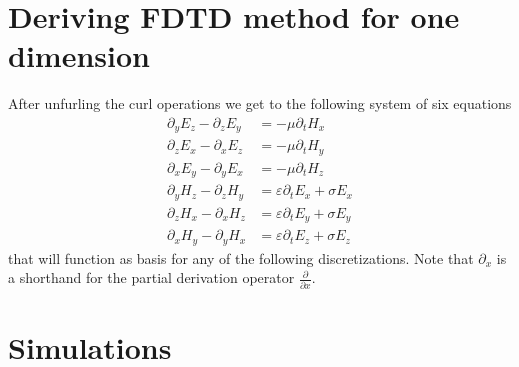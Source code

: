 \documentclass[]{report}
\begin{document}
\section{Deriving FDTD method for one dimension}
After unfurling the curl operations we get to the following system of six equations
\begin{align}
	\partial_y E_z - \partial_z E_y &= -\mu \partial_t H_x \\
	\partial_z E_x - \partial_x E_z &= -\mu \partial_t H_y \\
	\partial_x E_y - \partial_y E_x &= -\mu \partial_t H_z \\
	\partial_y H_z - \partial_z H_y &= \varepsilon \partial_t E_x + \sigma E_x \\
	\partial_z H_x - \partial_x H_z &= \varepsilon \partial_t E_y + \sigma E_y \\
	\partial_x H_y - \partial_y H_x &= \varepsilon \partial_t E_z + \sigma E_z
\end{align}
that will function as basis for any of the following discretizations. Note that \(\partial_x\) is a shorthand for the partial derivation operator \(\frac{\partial}{\partial x}\).

\section{Simulations}
\end{document}
